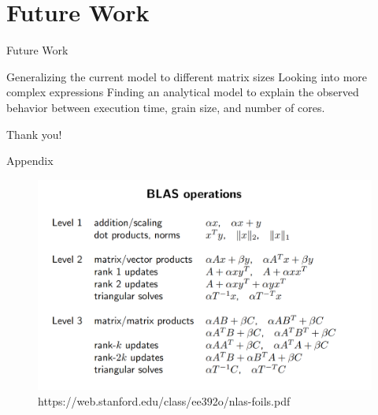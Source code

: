 \documentclass[10pt]{beamer}
\begin{document}
\section{Future Work}
\begin{frame}{Future Work}
\begin{outline}	
	\1Generalizing the current model to different matrix sizes
	\1Looking into more complex expressions
	\1Finding an analytical model to explain the observed behavior between execution time, grain size, and number of cores.
	 
%
%
%
\end{outline}
\end{frame}


\begin{frame}[standout]
  Thank you!
\end{frame}

\begin{frame}{Appendix}
	\begin{outline}	
		\begin{figure}[H]
			\includegraphics[scale=.2]{images/BLAS.png}	
			\caption{{https://web.stanford.edu/class/ee392o/nlas-foils.pdf}}
			\label{fig26}		
		\end{figure} 
	\end{outline}
\end{frame}
\end{document}
